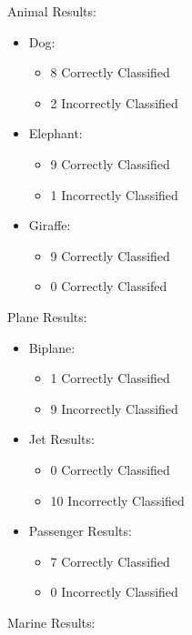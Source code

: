 \documentclass{article}
\begin{document}
Animal Results:
\begin{itemize}
    \item Dog:
    \begin{itemize}
        \item 8 Correctly Classified
        \item 2 Incorrectly Classified
        \end{itemize}
    \item Elephant:
    \begin{itemize}
        \item 9 Correctly Classified
        \item 1 Incorrectly Classified
        \end{itemize}
   \item Giraffe:
   \begin{itemize}
        \item 9 Correctly Classified
        \item 0 Correctly Classifed
        \end{itemize}
\end{itemize}
Plane Results:
\begin{itemize}
    \item Biplane:
    \begin{itemize}
        \item 1 Correctly Classified
        \item 9 Incorrectly Classified
        \end{itemize}
    \item Jet Results:
    \begin{itemize}
        \item 0 Correctly Classified
        \item 10 Incorrectly Classified
        \end{itemize}
    \item Passenger Results:
    \begin{itemize}
        \item 7 Correctly Classified
        \item 0 Incorrectly Classified
        \end{itemize}
\end{itemize}
Marine Results:
\end{document}
